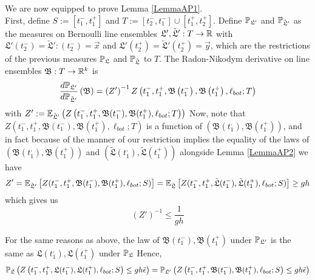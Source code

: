 	We are now equipped to prove Lemma \ref{LemmaAP1}.\\ 
	
	First, define $S:=[t_1^-, t_1^+]$ and $T:=[t_2^-, t_1^-]\cup [t_1^+,t_2^+]$. Define $\mathbb{P}_{\mathfrak L'}$ and $\mathbb{P}_{\tilde{\mathfrak{L}}'}$ as the measures on Bernoulli line ensembles $\mathfrak L', \tilde{\mathfrak{L}}': T\to \mathbb{R}$ with $\mathfrak L'(t_2^-)=\tilde{\mathfrak{L}}':(t_2^-)=\vec x$ and $\mathfrak L'(t_2^+)=\tilde{\mathfrak{L}}'(t_2^+)=\vec y$, which are the restrictions of the previous measures $\mathbb{P}_{\mathfrak L}$ and $\mathbb{P}_{\tilde{\mathfrak{L}}}$ to $T$. The Radon-Nikodym derivative on line ensembles $\mathfrak B: T\to \mathbb{R}^k$ is \begin{equation}\label{propRadon}\frac{d\mathbb{P}_{\mathfrak L'}}{d\mathbb{P}_{\tilde{\mathfrak L}'}}\left(\mathfrak B\right)=\left(Z'\right)^{-1}Z\left(t_1^-,t_1^+,\mathfrak{B}\left(t_1^-\right),\mathfrak{B}\left(t_1^+\right),\ell_{bot};T\right)
	\end{equation}
	with $Z':=\mathbb{E}_{\tilde{\mathfrak{L}}'}\left(Z\left(t_1^-, t_1^+, \mathfrak B(t_1^-), \mathfrak B(t_1^+), \ell_{bot}; T\right)\right)$ Now, note that $Z\left(t_1^-, t_1^+, \mathfrak B(t_1^-), \mathfrak B(t_1^+), \ell_{bot}; T\right)$ is a function of $(\mathfrak B(t_1^,), \mathfrak B(t_1^+))$, and in fact because of the manner of our restriction implies the equality of the laws of $\left(\mathfrak B(t_1^,), \mathfrak B(t_1^+)\right)$ and $(\tilde{\mathfrak L}(t_1^,), \tilde{\mathfrak L}(t_1^+))$ alongside Lemma \ref{LemmaAP2} we have
	\[
	Z'=\mathbb{E}_{\tilde{\mathfrak{L}}'}\left[Z(t_1^-, t_1^+, \mathfrak B(t_1^-),\mathfrak B(t_1^+),\ell_{bot};S)\right]=\mathbb{E}_{\tilde{\mathfrak{L}}}\left[Z(t_1^-, t_1^+, \tilde{\mathfrak L}(t_1^-),\tilde{\mathfrak L}(t_1^+),\ell_{bot};S)\right]\geq gh
\]
which gives us 
\begin{equation}
	\label{Zineq} \left(Z'\right)^{-1}\leq \frac{1}{gh}
\end{equation}

	For the same reasons as above, the law of $\mathfrak B(t_1^-), \mathfrak{B}(t_1^+)$ under $\mathbb{P}_{\mathfrak L'}$ is the same as $\mathfrak L(t_1^,), \mathfrak L(t_1^+)$ under $\mathbb{P}_{\mathfrak L}$ Hence,
	\begin{equation}
	\mathbb{P}_{\mathfrak L}\left(Z\left(t_1^-,t_1^+,\mathfrak L(t_1^-),\mathfrak L(t_1^+),\ell_{bot};S\right)\leq gh\tilde \epsilon\right)=\mathbb{P}_{\mathfrak L'}\left(Z\left(t_1^-,t_1^+,\mathfrak B(t_1^-),\mathfrak B(t_1^+),\ell_{bot};S\right)\leq gh\tilde \epsilon\right)
	\end{equation}
	
